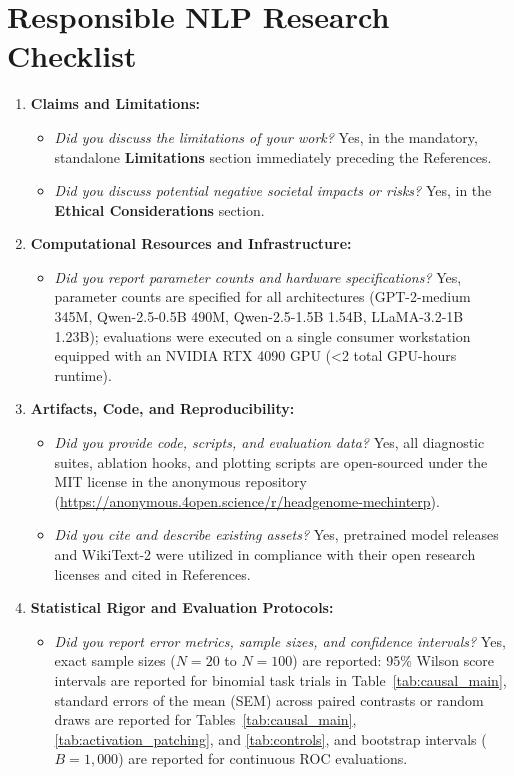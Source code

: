 \documentclass[11pt]{article}
\begin{document}
\section{Responsible NLP Research Checklist}
\label{sec:checklist}
\begin{enumerate}
    \setlength{\itemsep}{1pt}
    \item \textbf{Claims and Limitations:} 
    \begin{itemize}
        \setlength{\itemsep}{0pt}
        \item \textit{Did you discuss the limitations of your work?} Yes, in the mandatory, standalone \textbf{Limitations} section immediately preceding the References.
        \item \textit{Did you discuss potential negative societal impacts or risks?} Yes, in the \textbf{Ethical Considerations} section.
    \end{itemize}
    \item \textbf{Computational Resources and Infrastructure:}
    \begin{itemize}
        \setlength{\itemsep}{0pt}
        \item \textit{Did you report parameter counts and hardware specifications?} Yes, parameter counts are specified for all architectures (GPT-2-medium 345M, Qwen-2.5-0.5B 490M, Qwen-2.5-1.5B 1.54B, LLaMA-3.2-1B 1.23B); evaluations were executed on a single consumer workstation equipped with an NVIDIA RTX 4090 GPU (<2 total GPU-hours runtime).
    \end{itemize}
    \item \textbf{Artifacts, Code, and Reproducibility:}
    \begin{itemize}
        \setlength{\itemsep}{0pt}
        \item \textit{Did you provide code, scripts, and evaluation data?} Yes, all diagnostic suites, ablation hooks, and plotting scripts are open-sourced under the MIT license in the anonymous repository (\url{https://anonymous.4open.science/r/headgenome-mechinterp}).
        \item \textit{Did you cite and describe existing assets?} Yes, pretrained model releases and WikiText-2 were utilized in compliance with their open research licenses and cited in References.
    \end{itemize}
    \item \textbf{Statistical Rigor and Evaluation Protocols:}
    \begin{itemize}
        \setlength{\itemsep}{0pt}
        \item \textit{Did you report error metrics, sample sizes, and confidence intervals?} Yes, exact sample sizes ($N=20$ to $N=100$) are reported: 95\% Wilson score intervals are reported for binomial task trials in Table~\ref{tab:causal_main}, standard errors of the mean (SEM) across paired contrasts or random draws are reported for Tables~\ref{tab:causal_main}, \ref{tab:activation_patching}, and \ref{tab:controls}, and bootstrap intervals ($B=1,000$) are reported for continuous ROC evaluations.

\end{itemize}
\end{enumerate}
\end{document}
